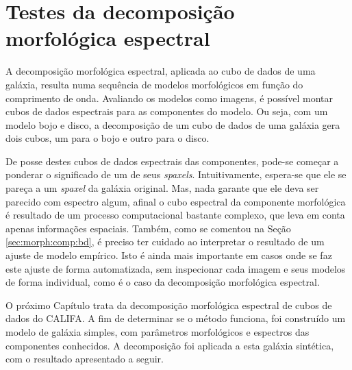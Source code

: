 


\chapter{Testes da decomposição morfológica espectral}
\label{sec:test}

A decomposição morfológica espectral, aplicada ao cubo de dados de uma galáxia,
resulta numa sequência de modelos morfológicos em função do comprimento de onda.
Avaliando os modelos como imagens, é possível montar cubos de dados espectrais
para as componentes do modelo. Ou seja, com um modelo bojo e disco, a
decomposição de um cubo de dados de uma galáxia gera dois cubos, um para o bojo
e outro para o disco.

De posse destes cubos de dados espectrais das componentes, pode-se começar a
ponderar o significado de um de seus {\em spaxels}. Intuitivamente, espera-se
que ele se pareça a um {\em spaxel} da galáxia original. Mas, nada garante que
ele deva ser parecido com espectro algum, afinal o cubo espectral da componente
morfológica é resultado de um processo computacional bastante complexo, que leva
em conta apenas informações espaciais. Também, como se comentou na Seção
\ref{sec:morph:comp:bd}, é preciso ter cuidado ao interpretar o resultado de um
ajuste de modelo empírico. Isto é ainda mais importante em casos onde se faz
este ajuste de forma automatizada, sem inspecionar cada imagem e seus modelos de
forma individual, como é o caso da decomposição morfológica espectral.

O próximo Capítulo trata da decomposição morfológica espectral de cubos de dados
do CALIFA. A fim de determinar se o método funciona, foi construído um modelo de
galáxia simples, com parâmetros morfológicos e espectros das componentes
conhecidos. A decomposição foi aplicada a esta galáxia sintética, com o
resultado apresentado a seguir.

